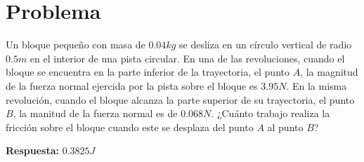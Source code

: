 \pagebreak

\section*{Problema}
Un bloque pequeño con masa de $0.04kg$ se desliza en un círculo vertical de radio $0.5m$ en el interior de una pista circular. En una de las revoluciones, cuando el bloque se encuentra en la parte inferior de la trayectoria, el punto $A$, la magnitud de la fuerza normal ejercida por la pista sobre el bloque es $3.95N$. En la misma revolución, cuando el bloque alcanza la parte superior de su trayectoria, el punto $B$, la manitud de la fuerza normal es de $0.068N$. ¿Cuánto trabajo realiza la fricción sobre el bloque cuando este se desplaza del punto $A$ al punto $B$?


\vspace{1cm}

\textbf{Respuesta: } \colorbox[rgb]{1,1,0}{$0.3825J$}























